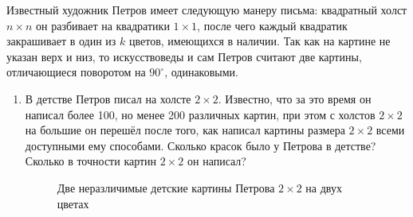 Известный художник Петров имеет следующую манеру письма: квадратный холст $n\times n$ он разбивает на квадратики $1\times 1$, после чего каждый квадратик закрашивает в один из $k$ цветов, имеющихся в наличии. Так как на картине не указан верх и низ, то искусствоведы и сам Петров считают две картины, отличающиеся поворотом на $90^{\circ}$, одинаковыми.
\begin{enumerate}
\item В детстве Петров писал на холсте $2\times 2$. Известно, что за это время он написал более 100, но менее 200 различных картин, при этом с холстов $2\times 2$ на большие он перешёл после того, как написал картины размера $2\times 2$ всеми доступными ему способами. Сколько красок было у Петрова в детстве? Сколько в точности картин $2\times 2$ он написал?

\begin{figure}[ht]
\begin{center}
\end{center}
\caption{Две неразличимые детские картины Петрова $2\times 2$ на двух цветах}
\end{figure}


\end{enumerate}
